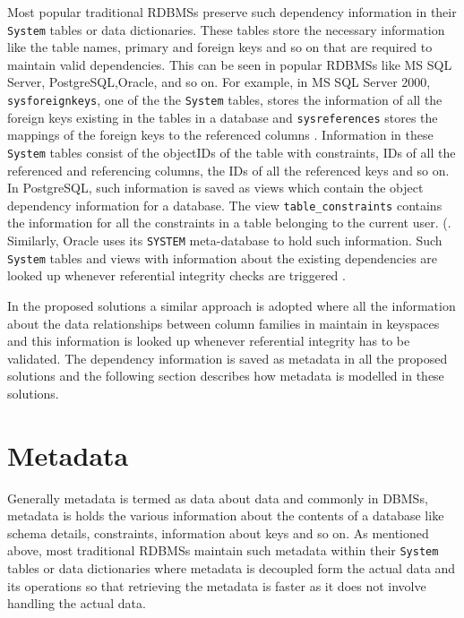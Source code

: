 Most popular traditional \acp{RDBMS} preserve such dependency information
in their \texttt{System} tables or data dictionaries.  These tables store the
necessary information like the table
names, primary and foreign keys and so on that are required to maintain valid
dependencies. 
This can be seen in popular \acp{RDBMS} like  MS SQL Server, PostgreSQL,Oracle,
and so on.  For example, in MS SQL Server 2000, 
\texttt{sysforeignkeys}, one of the the \texttt{System} tables, stores the
information of all the foreign keys existing in the tables in a database and \texttt{sysreferences} stores the mappings of
the foreign keys to the referenced columns \citep{sys:msdn}. 
Information in these \texttt{System} tables consist of  the objectIDs of the
table with constraints, IDs of all the referenced and referencing columns, the
IDs of all the referenced keys and so on. In PostgreSQL, such information is saved
as views which contain the object dependency information for a database.  The
view \texttt{table\_constraints} contains the information for all the
constraints in a table belonging to the current user. (\todo{\cite{}}.  Similarly,
Oracle uses its \texttt{SYSTEM} meta-database to hold such information.  Such
\texttt{System} tables and views with information about the existing
dependencies  are looked up whenever referential integrity checks are triggered
\citep{sys:msdn}. 

In the proposed solutions  a similar approach is adopted where  all the
information about the data relationships between column families in maintain in
keyspaces and this information is looked up whenever referential integrity has
to be validated.  The dependency information is saved as metadata in all the
proposed solutions and  the following section describes how metadata is
modelled in these solutions. 

\section{Metadata}\label{s:Metadata}
Generally metadata is termed as data about data and 
commonly in \acp{DBMS}, metadata is holds the various information
about the contents of a database like schema details, constraints, information
about keys and so on.  As mentioned above, most traditional \acp{RDBMS}
maintain such metadata within their \texttt{System} tables or data dictionaries
where metadata is decoupled form the actual data and its operations  so that
retrieving the metadata is faster as it does not involve handling the actual
data. 

